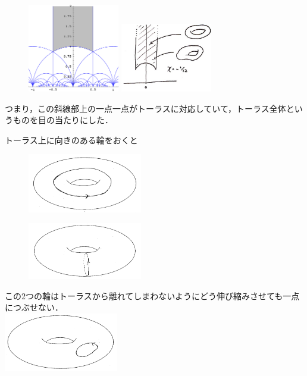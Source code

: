 \begin{figure}[h]
\begin{minipage}{0.5\hsize}
\includegraphics[width=4cm]{asaka8.png}
\end{minipage}
\begin{minipage}{0.5\hsize}
\includegraphics[width=4cm]{asaka9.jpg}
\end{minipage}
\end{figure}

つまり，この斜線部上の一点一点がトーラスに対応していて，トーラス全体というものを目の当たりにした．

トーラス上に向きのある輪をおくと\\
\begin{figure}[h]
\begin{minipage}{0.5\hsize}
\includegraphics[width=5cm]{asaka10.png}\\
\end{minipage}
\begin{minipage}{0.5\hsize}
\includegraphics[width=5cm]{asaka101.png}\\
\end{minipage}
\end{figure}
この2つの輪はトーラスから離れてしまわないようにどう伸び縮みさせても一点につぶせない．\\
\includegraphics[width=5cm]{asaka11.png}

